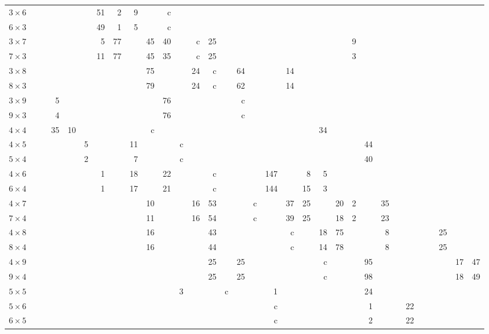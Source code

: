 \begin{table}
\begin{tabular}{l
rrrrrrrrrrrrrrrrrrrrrrrrrrrrrrr}
$3\times6$& & & & & &51&2&9& &c& & & & & & & & & & & & & & & & & & & & & \\
$6\times3$& & & & & &49&1&5& &c& & & & & & & & & & & & & & & & & & & & & \\
$3\times7$& & & & & &5&77& &45&40& &c&25& & & & & & & & &9& & & & & & & & & \\
$7\times3$& & & & & &11&77& &45&35& &c&25& & & & & & & & &3& & & & & & & & & \\
$3\times8$& & & & & & & & &75& & &24&c& &64& & &14& & & & & & & & & & & & & \\
$8\times3$& & & & & & & & &79& & &24&c& &62& & &14& & & & & & & & & & & & & \\
$3\times9$& & &5& & & & & & &76& & & & &c& & & & & & & & & & & & & & & & \\
$9\times3$& & &4& & & & & & &76& & & & &c& & & & & & & & & & & & & & & & \\
$4\times4$& & &35&10& & & & &c& & & & & & & & & & &34& & & & & & & & & & & \\
$4\times5$& & & & &5& & &11& & &c& & & & & & & & & & & &44& & & & & & & & \\
$5\times4$& & & & &2& & &7& & &c& & & & & & & & & & & &40& & & & & & & & \\
$4\times6$& & & & & &1& &18& &22& & &c& & & &147& &8&5& & & & & & & & & & & \\
$6\times4$& & & & & &1& &17& &21& & &c& & & &144& &15&3& & & & & & & & & & & \\
$4\times7$& & & & & & & & &10& & &16&53& & &c& &37&25& &20&2& &35& & & & & & & \\
$7\times4$& & & & & & & & &11& & &16&54& & &c& &39&25& &18&2& &23& & & & & & & \\
$4\times8$& & & & & & & & &16& & & &43& & & & &c& &18&75& & &8& & & & &25& & \\
$8\times4$& & & & & & & & &16& & & &44& & & & &c& &14&78& & &8& & & & &25& & \\
$4\times9$& & & & & & & & & & & & &25& &25& & & & &c& & &95& & & & & & &17&47\\
$9\times4$& & & & & & & & & & & & &25& &25& & & & &c& & &98& & & & & & &18&49\\
$5\times5$& & & & & & & & & & &3& & &c& & &1& & & & & &24& & & & & & & & \\
$5\times6$& & & & & & & & & & & & & & & & &c& & & & & &1& & &22& & & & & \\
$6\times5$& & & & & & & & & & & & & & & & &c& & & & & &2& & &22& & & & & \\

\end{tabular}
\end{table}

